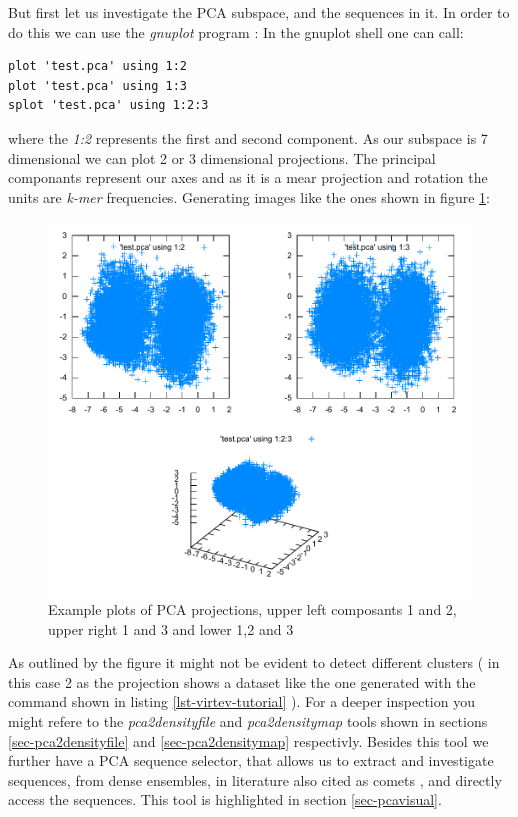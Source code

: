 But first let us investigate the PCA subspace,
and the sequences in it. In order to do this we can use the
\emph{gnuplot} program \cite{gnuplot}:
In the gnuplot shell one can call:
\begin{lstlisting}
plot 'test.pca' using 1:2
plot 'test.pca' using 1:3
splot 'test.pca' using 1:2:3
\end{lstlisting}
where the \emph{1:2} represents the first and second component.
As our subspace is 7 dimensional we can plot 2 or 3 dimensional
projections. The principal componants represent our axes and as
it is a mear projection and rotation the units are \emph{k-mer}
frequencies. Generating images like the ones shown in figure
\ref{fig-pca-tutorial}:
\begin{figure}
  \begin{center}
    \includegraphics[scale=0.9]{pca-tutorial.pdf}
    \caption{Example plots of PCA projections, upper left composants 1
      and 2, upper right 1 and 3 and lower 1,2 and 3}
    \label{fig-pca-tutorial}
  \end{center}
\end{figure}
As outlined by the figure it might not be evident to detect
different clusters ( in this case 2 as the projection shows a dataset
like the one generated with the command shown in listing
\ref{lst-virtev-tutorial} ). For a deeper inspection you might refere
to the \emph{pca2densityfile} and \emph{pca2densitymap} tools shown in
sections \ref{sec-pca2densityfile} and \ref{sec-pca2densitymap}
respectivly. Besides this tool we further have a PCA sequence selector,
that allows us to extract and investigate sequences, from
dense ensembles, in literature also cited as comets \cite{lauriane},
and directly access the sequences. This tool is highlighted in section
\ref{sec-pcavisual}.

